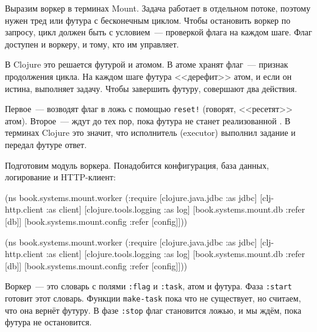Выразим воркер в терминах Mount. Задача работает в отдельном потоке, поэтому
нужен тред или футура с бесконечным циклом. Чтобы остановить воркер по запросу,
цикл должен быть с условием~--- проверкой флага на каждом шаге. Флаг доступен и
воркеру, и тому, кто им управляет.


В Clojure это решается футурой и атомом. В атоме хранят флаг~--- признак
продолжения цикла. На каждом шаге футура <<дерефит>> атом, и если он истина,
выполняет задачу. Чтобы завершить футуру, совершают два действия.

Первое~--- возводят флаг в ложь с помощью \verb|reset!| (говорят, <<ресетят>>
атом). Второе~--- ждут до тех пор, пока футура не станет реализованной
. В терминах Clojure это значит, что исполнитель (executor)
выполнил задание и передал футуре ответ.

Подготовим модуль воркера. Понадобится конфигурация, база данных, логирование и
HTTP-клиент:

\ifnarrow

\begin{english}
  \begin{clojure}
(ns book.systems.mount.worker
  (:require
   [clojure.java.jdbc :as jdbc]
   [clj-http.client :as client]
   [clojure.tools.logging :as log]
   [book.systems.mount.db :refer [db]]
   [book.systems.mount.config
     :refer [config]]))
  \end{clojure}
\end{english}

\else

\begin{english}
  \begin{clojure}
(ns book.systems.mount.worker
  (:require
   [clojure.java.jdbc :as jdbc]
   [clj-http.client :as client]
   [clojure.tools.logging :as log]
   [book.systems.mount.db :refer [db]]
   [book.systems.mount.config :refer [config]]))
  \end{clojure}
\end{english}

\fi

Воркер~--- это словарь с полями \verb|:flag| и \verb|:task|, атом и футура. Фаза
\verb|:start| готовит этот словарь. Функции \verb|make-task| пока что не
существует, но считаем, что она вернёт футуру. В фазе \verb|:stop| флаг
становится ложью, и мы ждём, пока футура не остановится.


